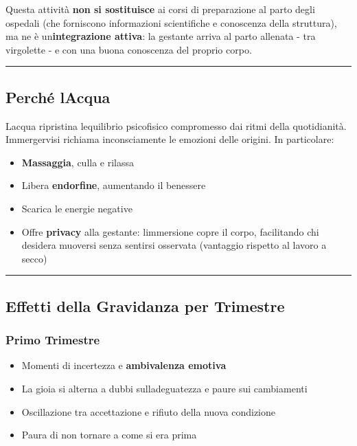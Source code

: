 \documentclass[a4paper,11pt]{article}
\providecommand{\tightlist}{%
  \setlength{\itemsep}{0pt}\setlength{\parskip}{0pt}}
\begin{document}
Questa attività \textbf{non si sostituisce} ai corsi di preparazione al
parto degli ospedali (che forniscono informazioni scientifiche e
conoscenza della struttura), ma ne è
un\textquotesingle{}\textbf{integrazione attiva}: la gestante arriva al
parto allenata - tra virgolette - e con una buona conoscenza del proprio
corpo.

\begin{center}\rule{0.5\linewidth}{0.5pt}\end{center}

\subsection{Perché l\textquotesingle Acqua}\label{perchuxe9-lacqua}

L\textquotesingle acqua ripristina l\textquotesingle equilibrio
psicofisico compromesso dai ritmi della quotidianità. Immergervisi
richiama inconsciamente le emozioni delle origini. In particolare:

\begin{itemize}
      \tightlist
      \item
            \textbf{Massaggia}, culla e rilassa
      \item
            Libera \textbf{endorfine}, aumentando il benessere
      \item
            Scarica le energie negative
      \item
            Offre \textbf{privacy} alla gestante: l\textquotesingle immersione
            copre il corpo, facilitando chi desidera muoversi senza sentirsi
            osservata (vantaggio rispetto al lavoro a secco)
\end{itemize}

\begin{center}\rule{0.5\linewidth}{0.5pt}\end{center}

\subsection{Effetti della Gravidanza per
      Trimestre}\label{effetti-della-gravidanza-per-trimestre}

\subsubsection{Primo Trimestre}\label{primo-trimestre}

\begin{itemize}
      \tightlist
      \item
            Momenti di incertezza e \textbf{ambivalenza emotiva}
      \item
            La gioia si alterna a dubbi sull\textquotesingle adeguatezza e paure
            sui cambiamenti
      \item
            Oscillazione tra accettazione e rifiuto della nuova condizione
      \item
            Paura di non tornare a come si era prima
\end{itemize}
\end{document}
